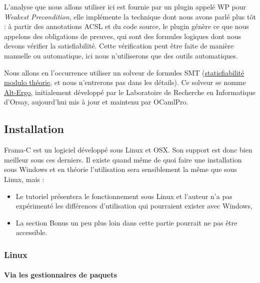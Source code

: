\documentclass[12pt,francais,]{scrbook}
\newenvironment{zdsalertblock}[1]{%
  \tcolorbox[beamer,%
    noparskip,breakable,
    colback=LightCoral,colframe=DarkRed,%
    colbacklower=Tomato,%
    title=#1]
}{\endtcolorbox}
\begin{document}
L'analyse que nous allons utiliser ici est fournie par un plugin appelé
WP pour \emph{Weakest Precondition}, elle implémente la technique dont
nous avons parlé plus tôt : à partir des annotations ACSL et du code
source, le plugin génère ce que nous appelons des obligations de
preuves, qui sont des formules logiques dont nous devons vérifier la
satisfiabilité. Cette vérification peut être faite de manière manuelle
ou automatique, ici nous n'utiliserons que des outils automatiques.

Nous allons en l'occurrence utiliser un solveur de formules SMT
(\href{https://fr.wikipedia.org/wiki/Satisfiability_modulo_theories}{statisfiabilité
modulo théorie}, et nous n'entrerons pas dans les détails). Ce solveur
se nomme \href{http://alt-ergo.lri.fr/}{Alt-Ergo}, initialement
développé par le Laboratoire de Recherche en Informatique d'Orsay,
aujourd'hui mis à jour et maintenu par OCamlPro.

\subsection{Installation}\label{installation}

Frama-C est un logiciel développé sous Linux et OSX. Son support est
donc bien meilleur sous ces derniers. Il existe quand même de quoi faire
une installation sous Windows et en théorie l'utilisation sera
sensiblement la même que sous Linux, mais :

\begin{zdsalertblock}{Attention}
  \begin{itemize}
  \item Le tutoriel présentera le
    fonctionnement sous Linux et l'auteur n'a pas expérimenté les
    différences d'utilisation qui pourraient exister avec
    Windows,
  \item La section \og{}Bonus\fg{} un peu plus loin dans cette
    partie pourrait ne pas être accessible.
  \end{itemize}
\end{zdsalertblock}

\clearpage

\subsubsection{Linux}\label{linux}

\paragraph{Via les gestionnaires de
paquets}\label{via-les-gestionnaires-de-paquets}
\end{document}
